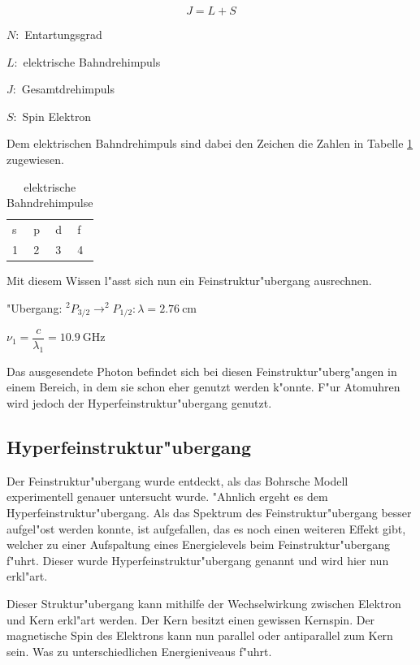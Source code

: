 \begin{refsection}
\begin{equation}
	J = L + S
\end{equation}

$N:$ Entartungsgrad

$L:$ elektrische Bahndrehimpuls

$J:$ Gesamtdrehimpuls

$S:$ Spin Elektron

Dem elektrischen Bahndrehimpuls sind dabei den Zeichen die Zahlen in
Tabelle \ref{atomuhr:drehimpulsnotation} zugewiesen.

\begin{table}
	\centering	
	\begin{tabular}{llll}
		s & p & d & f \\
		1 & 2 & 3 & 4 \\
	\end{tabular}
	\caption{elektrische Bahndrehimpulse}
	\label{atomuhr:drehimpulsnotation}
\end{table}

Mit diesem Wissen l"asst sich nun ein Feinstruktur"ubergang ausrechnen. 
\begin{center}
		"Ubergang: $^2P_{3/2} \rightarrow ^2P_{1/2}: \lambda = \SI{2.76}{\centi\meter}$
		
		$\nu_1 = \dfrac{c}{\lambda_1} = \SI{10.9}{\giga\hertz}$
\end{center}

Das ausgesendete Photon befindet sich bei diesen
Feinstruktur"uberg"angen in einem Bereich, in dem sie schon eher
genutzt werden k"onnte. F"ur Atomuhren wird jedoch der
Hyperfeinstruktur"ubergang genutzt.

\subsection{Hyperfeinstruktur"ubergang}
\label{sec:hyperf}
Der Feinstruktur"ubergang wurde entdeckt, als das Bohrsche Modell
experimentell genauer untersucht wurde. "Ahnlich ergeht es dem
Hyperfeinstruktur"ubergang. Als das Spektrum des Feinstruktur"ubergang
besser aufgel"ost werden konnte, ist aufgefallen, das es noch einen
weiteren Effekt gibt, welcher zu einer Aufspaltung eines Energielevels
beim Feinstruktur"ubergang f"uhrt. Dieser wurde
Hyperfeinstruktur"ubergang genannt und wird hier nun erkl"art.

Dieser Struktur"ubergang kann mithilfe der Wechselwirkung zwischen
Elektron und Kern erkl"art werden. Der Kern besitzt einen gewissen
Kernspin. Der magnetische Spin des Elektrons kann nun parallel oder
antiparallel zum Kern sein. Was zu unterschiedlichen Energieniveaus
f"uhrt.


\end{refsection}

